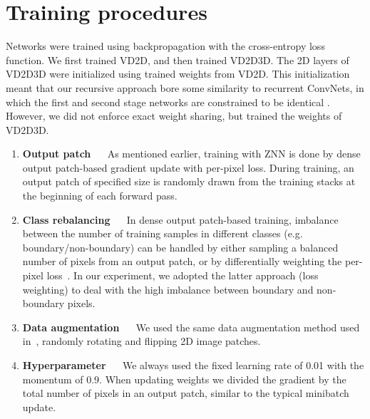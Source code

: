 \documentclass{article} %
\begin{document}
\section{Training procedures}
Networks were trained using backpropagation with the cross-entropy
loss function.  We first trained VD2D, and then trained VD2D3D.  The
2D layers of VD2D3D were initialized using trained weights from VD2D.
This initialization meant that our recursive approach bore some
similarity to recurrent ConvNets, in which the first and second stage
networks are constrained to be identical \cite{Pinheiro2014}.
However, we did not enforce exact weight sharing, but trained the
weights of VD2D3D.

\begin{enumerate}[]
\item{\bf Output patch} $\quad$
As mentioned earlier, training with ZNN is done by dense output patch-based gradient update with per-pixel loss. During training, an output patch of specified size is randomly drawn from the training stacks at the beginning of each forward pass.

\item{\bf Class rebalancing} $\quad$
In dense output patch-based training, imbalance between the number of training samples in different classes (e.g. boundary/non-boundary) can be handled by either sampling a balanced number of pixels from an output patch, or by differentially weighting the per-pixel loss~\cite{Long2015}. In our experiment, we adopted the latter approach (loss weighting) to deal with the high imbalance between boundary and non-boundary pixels.

\item{\bf Data augmentation} $\quad$
We used the same data augmentation method used in~\cite{Ciresan2012}, randomly rotating and flipping 2D image patches.

\item{\bf Hyperparameter} $\quad$
We always used the fixed learning rate of 0.01 with the momentum of 0.9. When updating weights we divided the gradient by the total number of pixels in an output patch, similar to the typical minibatch update.
\end{enumerate}
\end{document}
